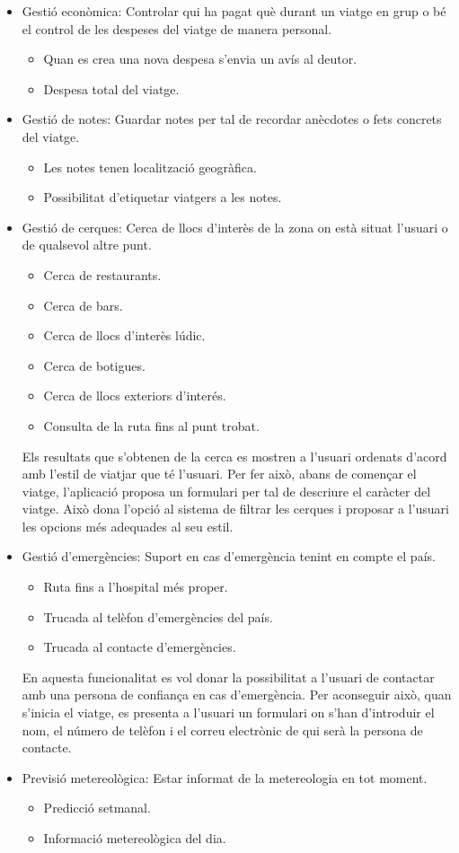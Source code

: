 \begin{itemize}
\item{Gestió econòmica:} Controlar qui ha pagat què durant un viatge en grup o bé
el control de les despeses del viatge de manera personal.
\begin{itemize}
\item{}Quan es crea una nova despesa s’envia un avís al deutor.
\item{}Despesa total del viatge.
\end{itemize}
\item{}Gestió de notes: Guardar notes per tal de recordar anècdotes o fets concrets
del viatge.
\begin{itemize}
\item{}Les notes tenen localització geogràfica.
\item{}Possibilitat d’etiquetar viatgers a les notes.
\end{itemize}
\item{}Gestió de cerques: Cerca de llocs d’interès de la zona on està situat l’usuari o de qualsevol altre punt.
\begin{itemize}
\item{}Cerca de restaurants.
\item{}Cerca de bars.
\item{}Cerca de llocs d’interès lúdic.
\item{}Cerca de botigues.
\item{}Cerca de llocs exteriors d’interés.
\item{}Consulta de la ruta fins al punt trobat.
\end{itemize}
Els resultats que s’obtenen de la cerca es mostren a l’usuari ordenats d’acord amb l’estil de viatjar que té l’usuari. Per fer això, abans de començar el viatge, l’aplicació proposa un formulari per tal de descriure el caràcter del viatge. Això dona l’opció al sistema de filtrar les cerques i proposar a l’usuari les opcions més adequades al seu estil.

\item{}Gestió d’emergències: Suport en cas d’emergència tenint en compte el país.
\begin{itemize}
\item{}Ruta fins a l’hospital més proper.
\item{}Trucada al telèfon d’emergències del país.
\item{}Trucada al contacte d’emergències.
\end{itemize}
En aquesta funcionalitat es vol donar la possibilitat a l’usuari de contactar amb una persona de confiança en cas d’emergència. Per aconseguir això, quan s’inicia el viatge, es presenta a l’usuari un formulari on s’han d’introduir el nom, el número de telèfon i el correu electrònic de qui serà la persona de contacte.

\item{}Previsió metereològica: Estar informat de la metereologia en tot moment.
\begin{itemize}
\item{}Predicció setmanal.
\item{}Informació metereològica del dia.
\end{itemize} 
\end{itemize}

